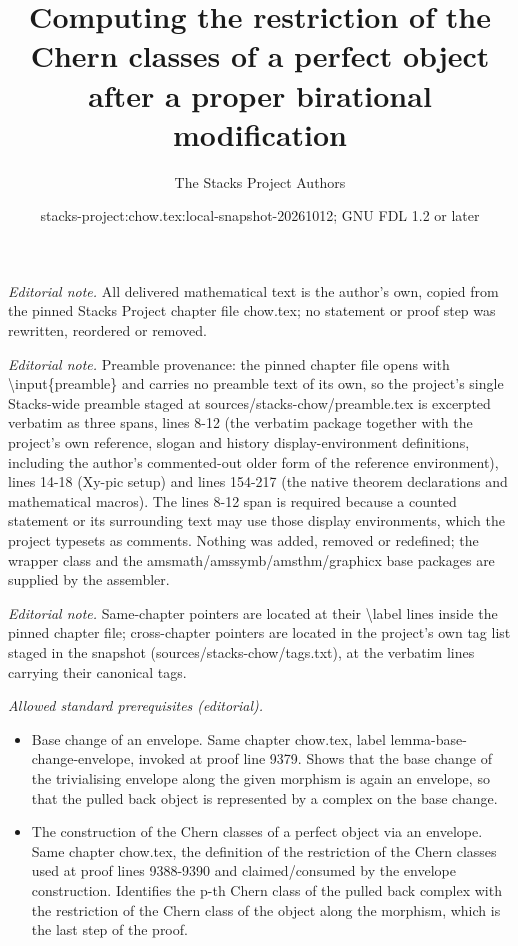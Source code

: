 \documentclass[10pt,a4paper]{amsart}
\title{Computing the restriction of the Chern classes of a perfect object after a proper birational modification}
\author{The Stacks Project Authors}
\date{stacks-project:chow.tex:local-snapshot-20261012; GNU FDL 1.2 or later}
\theoremstyle{plain}
\theoremstyle{definition}
\theoremstyle{remark}
\numberwithin{equation}{subsection}
\begin{document}
\maketitle
\noindent\textit{Editorial note.} All delivered mathematical text is the author's own, copied from the pinned Stacks Project chapter file chow.tex; no statement or proof step was rewritten, reordered or removed.\par\medskip
\noindent\textit{Editorial note.} Preamble provenance: the pinned chapter file opens with \textbackslash{}input\{preamble\} and carries no preamble text of its own, so the project's single Stacks-wide preamble staged at sources/stacks-chow/preamble.tex is excerpted verbatim as three spans, lines 8-12 (the verbatim package together with the project's own reference, slogan and history display-environment definitions, including the author's commented-out older form of the reference environment), lines 14-18 (Xy-pic setup) and lines 154-217 (the native theorem declarations and mathematical macros). The lines 8-12 span is required because a counted statement or its surrounding text may use those display environments, which the project typesets as comments. Nothing was added, removed or redefined; the wrapper class and the amsmath/amssymb/amsthm/graphicx base packages are supplied by the assembler.\par\medskip
\noindent\textit{Editorial note.} Same-chapter pointers are located at their \textbackslash{}label lines inside the pinned chapter file; cross-chapter pointers are located in the project's own tag list staged in the snapshot (sources/stacks-chow/tags.txt), at the verbatim lines carrying their canonical tags.\par\medskip
\noindent\textit{Allowed standard prerequisites (editorial).}\begin{itemize}
\item Base change of an envelope. Same chapter chow.tex, label lemma-base-change-envelope, invoked at proof line 9379. Shows that the base change of the trivialising envelope along the given morphism is again an envelope, so that the pulled back object is represented by a complex on the base change.
\item The construction of the Chern classes of a perfect object via an envelope. Same chapter chow.tex, the definition of the restriction of the Chern classes used at proof lines 9388-9390 and claimed/consumed by the envelope construction. Identifies the p-th Chern class of the pulled back complex with the restriction of the Chern class of the object along the morphism, which is the last step of the proof.
\end{itemize}\medskip
\end{document}
